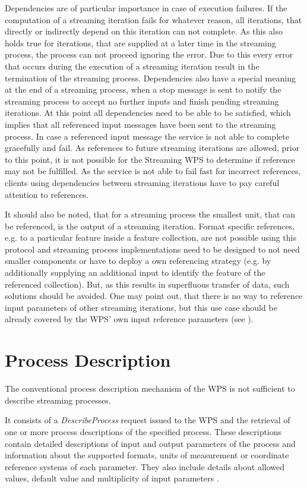 		Dependencies are of particular importance in case of execution failures. If the computation of a streaming iteration fails for whatever reason, all iterations, that directly or indirectly depend on this iteration can not complete. As this also holds true for iterations, that are supplied at a later time in the streaming process, the process can not proceed ignoring the error. Due to this every error that occurs during the execution of a streaming iteration result in the termination of the streaming process.
		Dependencies also have a special meaning at the end of a streaming process, when a stop message is sent to notify the streaming process to accept no further inputs and finish pending streaming iterations. At this point all dependencies need to be able to be satisfied, which implies that all referenced input messages have been sent to the streaming process. In case a referenced input message the service is not able to complete gracefully and fail. As references to future streaming iterations are allowed, prior to this point, it is not possible for the Streaming \ac{WPS} to determine if reference may not be fulfilled. As the service is not able to fail fast for incorrect references, clients using dependencies between streaming iterations have to pay careful attention to references.

		It should also be noted, that for a streaming process the smallest unit, that can be referenced, is the output of a streaming iteration. Format specific references, e.g. to a particular feature inside a feature collection, are not possible using this protocol and streaming process implementations need to be designed to not need smaller components or have to deploy a own referencing strategy (e.g. by additionally supplying an additional input to identify the feature of the referenced collection). But, as this results in superfluous transfer of data, such solutions should be avoided. One may point out, that there is no way to reference input parameters of other streaming iterations, but this use case should be already covered by the \ac{WPS}' own input reference parameters (see ).

	\section{Process Description}
		\label{sec:stream:processdescription}
		The conventional process description mechanism of the \ac{WPS} is not sufficient to describe streaming processes.

		It consists of a \emph{DescribeProcess} request issued to the \ac{WPS} and the retrieval of one or more process descriptions of the specified process. These descriptions contain detailed descriptions of input and output parameters of the process and information about the supported formats, units of measurement or coordinate reference systems of each parameter. They also include details about allowed values, default value and multiplicity of input parameters \citep{ogc:wps}.

